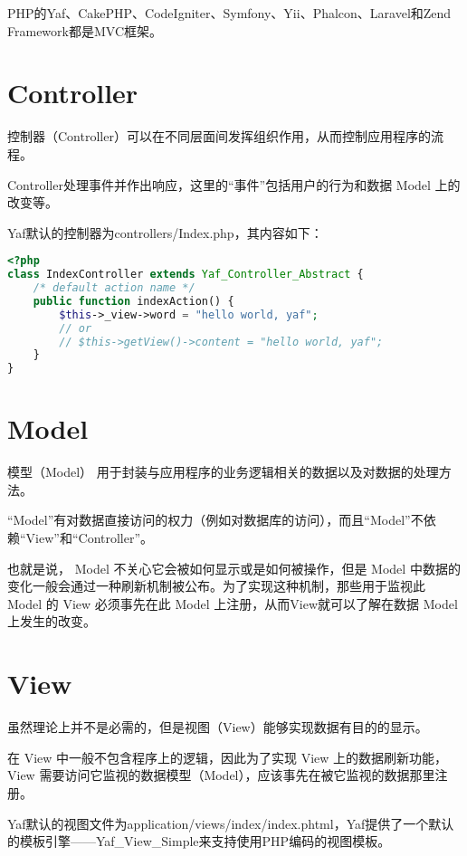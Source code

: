PHP的Yaf、CakePHP、CodeIgniter、Symfony、Yii、Phalcon、Laravel和Zend Framework都是MVC框架。


\section{Controller}

控制器（Controller）可以在不同层面间发挥组织作用，从而控制应用程序的流程。

Controller处理事件并作出响应，这里的“事件”包括用户的行为和数据 Model 上的改变等。



Yaf默认的控制器为controllers/Index.php，其内容如下：

\begin{lstlisting}[language=PHP]
<?php
class IndexController extends Yaf_Controller_Abstract {
    /* default action name */
    public function indexAction() {
        $this->_view->word = "hello world, yaf";
        // or
        // $this->getView()->content = "hello world, yaf";
    }
}
\end{lstlisting}

\section{Model}

模型（Model） 用于封装与应用程序的业务逻辑相关的数据以及对数据的处理方法。

“Model”有对数据直接访问的权力（例如对数据库的访问），而且“Model”不依赖“View”和“Controller”。

也就是说， Model 不关心它会被如何显示或是如何被操作，但是 Model 中数据的变化一般会通过一种刷新机制被公布。为了实现这种机制，那些用于监视此 Model 的 View 必须事先在此 Model 上注册，从而View就可以了解在数据 Model 上发生的改变。




\section{View}

虽然理论上并不是必需的，但是视图（View）能够实现数据有目的的显示。

在 View 中一般不包含程序上的逻辑，因此为了实现 View 上的数据刷新功能，View 需要访问它监视的数据模型（Model），应该事先在被它监视的数据那里注册。




Yaf默认的视图文件为application/views/index/index.phtml，Yaf提供了一个默认的模板引擎——Yaf\_View\_Simple来支持使用PHP编码的视图模板。

